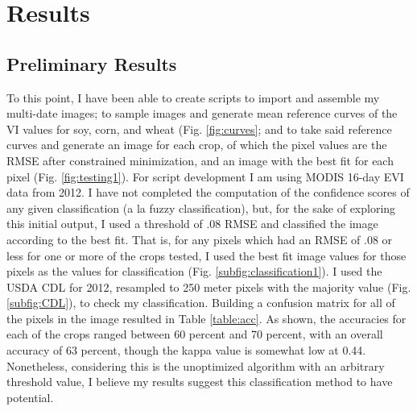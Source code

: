 \chapter{Results}
\section*{Preliminary Results}
\label{sec:prelim}

To this point, I have been able to create scripts to import and assemble my multi-date images; to sample images and generate mean reference curves of the VI values for soy, corn, and wheat (Fig. \ref{fig:curves}; and to take said reference curves and generate an image for each crop, of which the pixel values are the RMSE after constrained minimization, and an image with the best fit for each pixel (Fig. \ref{fig:testing1}). For script development I am using MODIS 16-day EVI data from 2012. I have not completed the computation of the confidence scores of any given classification (a la fuzzy classification), but, for the sake of exploring this initial output, I used a threshold of .08 RMSE and classified the image according to the best fit. That is, for any pixels which had an RMSE of .08 or less for one or more of the crops tested, I used the best fit image values for those pixels as the values for classification (Fig. \ref{subfig:classification1}). I used the USDA CDL for 2012, resampled to 250 meter pixels with the majority value (Fig. \ref{subfig:CDL}), to check my classification. Building a confusion matrix for all of the pixels in the image resulted in Table \ref{table:acc}. As shown, the accuracies for each of the crops ranged between 60 percent and 70 percent, with an overall accuracy of 63 percent, though the kappa value is somewhat low at 0.44. Nonetheless, considering this is the unoptimized algorithm with an arbitrary threshold value, I believe my results suggest this classification method to have potential.

